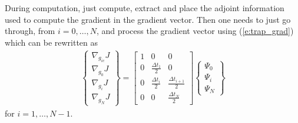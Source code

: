 \documentclass[10pt]{article}
\begin{document}
During computation, just compute, extract and place the adjoint information
used to compute the gradient in the gradient vector.  Then one needs to just
go through, from $i=0,\dots,N$, and process the gradient vector using
(\ref{e:trap_grad}) which can be rewritten as
\begin{eqnarray}
\left\{\begin{array}{c} 
\nabla_{g_{ic}} J \\ \nabla_{g_0} J \\ \nabla_{g_i} J \\ \nabla_{g_N} J 
\end{array}\right\} = 
\left[ \begin{array}{ccc} 
1 & 0 & 0 \\
0 & \frac{\Delta t_1}{2} & 0 \\
0 & \frac{\Delta t_i}{2} & \frac{\Delta t_{i+1}}{2} \\
0 & 0 & \frac{\Delta t_N}{2}
\end{array} \right] 
\left\{\begin{array}{c} \Psi_0 \\ \Psi_i \\\Psi_N \end{array}\right\}
\end{eqnarray}
for $i=1,\dots,N-1$.
\end{document}
